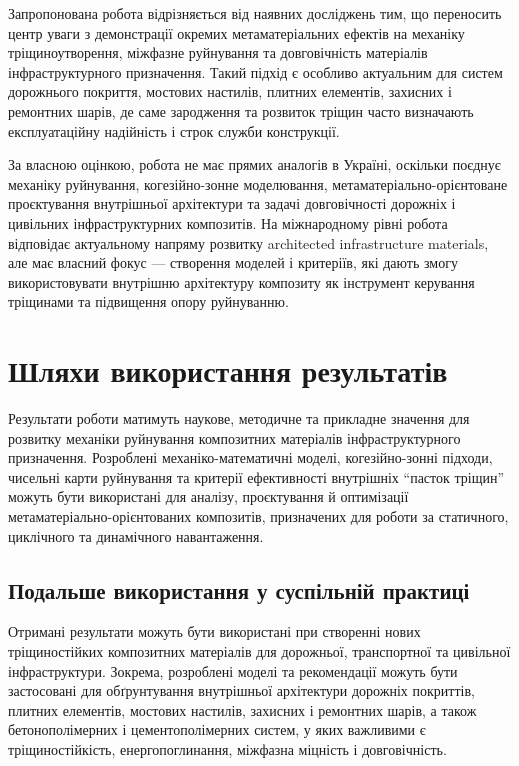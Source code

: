 \documentclass[12pt,a4paper]{article}
\begin{document}
Запропонована робота відрізняється від наявних досліджень тим, що переносить центр уваги з демонстрації окремих метаматеріальних ефектів на механіку тріщиноутворення, міжфазне руйнування та довговічність матеріалів інфраструктурного призначення. Такий підхід є особливо актуальним для систем дорожнього покриття, мостових настилів, плитних елементів, захисних і ремонтних шарів, де саме зародження та розвиток тріщин часто визначають експлуатаційну надійність і строк служби конструкції.

За власною оцінкою, робота не має прямих аналогів в Україні, оскільки поєднує механіку руйнування, когезійно-зонне моделювання, метаматеріально-орієнтоване проєктування внутрішньої архітектури та задачі довговічності дорожніх і цивільних інфраструктурних композитів. На міжнародному рівні робота відповідає актуальному напряму розвитку architected infrastructure materials, але має власний фокус --- створення моделей і критеріїв, які дають змогу використовувати внутрішню архітектуру композиту як інструмент керування тріщинами та підвищення опору руйнуванню.


\section{Шляхи використання результатів}

Результати роботи матимуть наукове, методичне та прикладне значення для розвитку механіки руйнування композитних матеріалів інфраструктурного призначення. Розроблені механіко-математичні моделі, когезійно-зонні підходи, чисельні карти руйнування та критерії ефективності внутрішніх ``пасток тріщин'' можуть бути використані для аналізу, проєктування й оптимізації метаматеріально-орієнтованих композитів, призначених для роботи за статичного, циклічного та динамічного навантаження.

\subsection{Подальше використання у суспільній практиці}

Отримані результати можуть бути використані при створенні нових тріщиностійких композитних матеріалів для дорожньої, транспортної та цивільної інфраструктури. Зокрема, розроблені моделі та рекомендації можуть бути застосовані для обґрунтування внутрішньої архітектури дорожніх покриттів, плитних елементів, мостових настилів, захисних і ремонтних шарів, а також бетонополімерних і цементополімерних систем, у яких важливими є тріщиностійкість, енергопоглинання, міжфазна міцність і довговічність.
\end{document}
